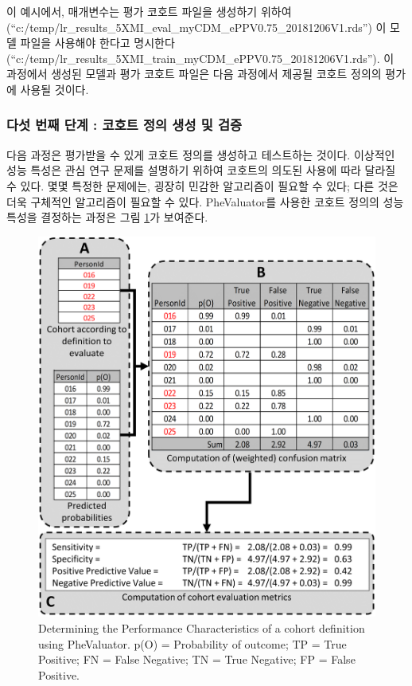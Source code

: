 \documentclass[10.5pt]{book}
\theoremstyle{definition}
\theoremstyle{definition}
\theoremstyle{definition}
\theoremstyle{remark}
\begin{document}
이 예시에서, 매개변수는 평가 코호트 파일을 생성하기 위하여
(``c:/temp/lr\_results\_5XMI\_eval\_myCDM\_ePPV0.75\_20181206V1.rds'')
이 모델 파일을 사용해야 한다고 명시한다
(``c:/temp/lr\_results\_5XMI\_train\_myCDM\_ePPV0.75\_20181206V1.rds'').
이 과정에서 생성된 모델과 평가 코호트 파일은 다음 과정에서 제공될 코호트
정의의 평가에 사용될 것이다.

\subsubsection*{다섯 번째 단계 : 코호트 정의 생성 및
검증}\label{-------}

다음 과정은 평가받을 수 있게 코호트 정의를 생성하고 테스트하는 것이다.
이상적인 성능 특성은 관심 연구 문제를 설명하기 위하여 코호트의 의도된
사용에 따라 달라질 수 있다. 몇몇 특정한 문제에는, 굉장히 민감한
알고리즘이 필요할 수 있다; 다른 것은 더욱 구체적인 알고리즘이 필요할 수
있다. PheValuator를 사용한 코호트 정의의 성능 특성을 결정하는 과정은
그림 \ref{fig:phevaluatorDiagram}가 보여준다.

\begin{figure}

{\centering \includegraphics[width=1\linewidth]{images/ClinicalValidity/PheValuatorEvaluation} 

}

\caption{Determining the Performance Characteristics of a cohort definition using PheValuator. p(O) = Probability of outcome; TP = True Positive; FN = False Negative; TN = True Negative; FP = False Positive.}\label{fig:phevaluatorDiagram}
\end{figure}
\end{document}
